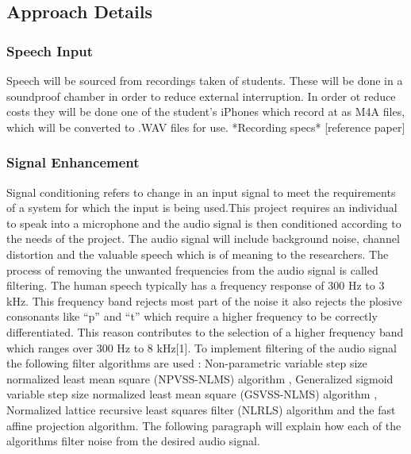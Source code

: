 \documentclass[10pt,twocolumn]{witseiepaper}
\begin{document}
\subsection{Approach Details}
\subsubsection{Speech Input}
Speech will be sourced from recordings taken of students. These will be done in a soundproof chamber in order to reduce external interruption. In order ot reduce costs they will be done one of the student's iPhones which record at as M4A files, which will be converted to .WAV files for use. *Recording specs* [reference paper]

\subsubsection{Signal Enhancement}
Signal conditioning refers to change in an input signal to meet the requirements of a system for which the input is being used.This project requires an individual to speak into a microphone and the audio signal is then conditioned according to the needs of the project. The audio signal will include background noise, channel distortion and the valuable speech which is of meaning to the researchers.  
The process of removing the unwanted frequencies from the audio signal is called filtering.
The human speech typically has a frequency response of 300 Hz to 3 kHz. This frequency band rejects most part of the noise it also rejects the plosive consonants like “p” and “t” which require a higher frequency to be correctly differentiated. This reason contributes to the selection of a higher frequency band which ranges over 300 Hz to 8 kHz[1]. To implement filtering of the audio signal the following filter algorithms are used : Non-parametric variable step size normalized least mean square (NPVSS-NLMS) algorithm , Generalized sigmoid variable step size normalized least mean square (GSVSS-NLMS) algorithm , Normalized lattice recursive least squares filter (NLRLS) algorithm and the fast affine projection algorithm. The following paragraph will explain how each of the algorithms filter noise from the desired audio signal.
\end{document}
